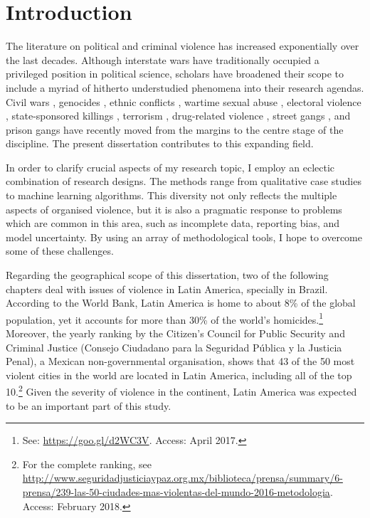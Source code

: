 \chapter{Introduction}
\label{chap:intro}

The literature on political and criminal violence has increased exponentially over the last decades. Although interstate wars have traditionally occupied a privileged position in political science, scholars have broadened their scope to include a myriad of hitherto understudied phenomena into their research agendas. Civil wars \citep{collier2004greed,fearon2003ethnicity,kalyvas2006logic}, genocides \citep{mamdani2014victims, power2013problem}, ethnic conflicts \citep{kaufmann1996possible, montalvo2005ethnic, sambanis2001ethnic}, wartime sexual abuse \citep{cohen2013explaining,wood2006variation,wood2009armed}, electoral violence \citep{hoglund2009electoral,wilkinson2006votes}, state-sponsored killings \citep{harff1988toward, krain1997state,krain2005international,uzonyi2014unpacking}, terrorism \citep{de2005quality,bueno2007propaganda,pape2003strategic}, drug-related violence \citep{holmes2006drugs,lessing2015logics,richani2013systems, shirk2010drug}, street gangs \citep{franzese2016youth,jones2009youth,rodgers2006living,sobel1987direct}, and prison gangs \citep{dias2011pulverizaccao,freire2014,skarbek2011governance,skarbek2012prison,skarbek2014social} have recently moved from the margins to the centre stage of the discipline. The present dissertation contributes to this expanding field.

In order to clarify crucial aspects of my research topic, I employ an eclectic combination of research designs. The methods range from qualitative case studies to machine learning algorithms. This diversity not only reflects the multiple aspects of organised violence, but it is also a pragmatic response to problems which are common in this area, such as incomplete data, reporting bias, and model uncertainty. By using an array of methodological tools, I hope to overcome some of these challenges.

Regarding the geographical scope of this dissertation, two of the following chapters deal with issues of violence in Latin America, specially in Brazil. According to the World Bank, Latin America is home to about 8\% of the global population, yet it accounts for more than 30\% of the world's homicides.\footnote{See: \url{https://goo.gl/d2WC3V}. Access: April 2017.} Moreover, the yearly ranking by the Citizen's Council for Public Security and Criminal Justice (Consejo Ciudadano para la Seguridad Pública y la Justicia Penal), a Mexican non-governmental organisation, shows that 43 of the 50 most violent cities in the world are located in Latin America, including all of the top 10.\footnote{For the complete ranking, see \url{http://www.seguridadjusticiaypaz.org.mx/biblioteca/prensa/summary/6-prensa/239-las-50-ciudades-mas-violentas-del-mundo-2016-metodologia}. Access: February 2018.} Given the severity of violence in the continent, Latin America was expected to be an important part of this study.

